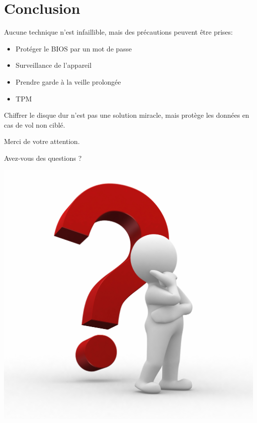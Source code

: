 \documentclass[red]{beamer}
\begin{document}
\section{Conclusion}
\begin{frame}
    Aucune technique n'est infaillible, mais des précautions peuvent être prises:
    \begin{itemize}
        \item Protéger le BIOS par un mot de passe %
        \item Surveillance de l'appareil
        \item Prendre garde à la veille prolongée
        \item TPM
    \end{itemize}

    \vspace{1cm}
    Chiffrer le disque dur n'est pas une solution miracle, mais protège
    les données en cas de vol non ciblé.
\end{frame}

\begin{frame}
\begin{center}
    {\Huge \alert{Merci de votre attention.}}
    
    {\Huge Avez-vous des questions ?}

    \includegraphics[height=0.60\textheight]{img/question.jpg}
\end{center}
\end{frame}
\end{document}
